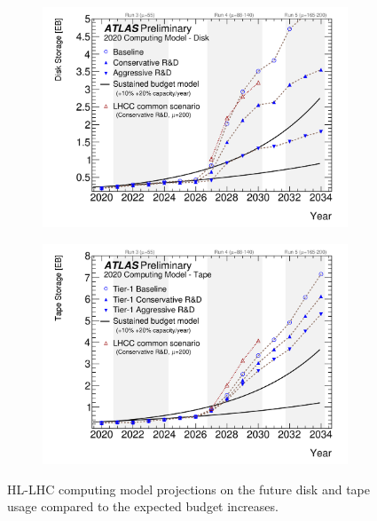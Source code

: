 \begin{figure}[h]
    \centering
    \begin{subfigure}{.5\textwidth}
        \centering
        \includegraphics[width=\textwidth]{content/img/computing model-disk.png}
        \label{fig:intro_computing_disk}
      \end{subfigure}%
      \begin{subfigure}{.5\textwidth}
        \centering
        \includegraphics[width=\textwidth]{content/img/computing model-tape.png}
        \label{fig:intro_computing_tape}
    \end{subfigure}%
    \caption{HL-LHC computing model projections on the future disk and tape usage compared to the expected budget increases.\cite{CERN-LHCC-2020-015}}
    \label{fig:intro_computing_models}
\end{figure}

